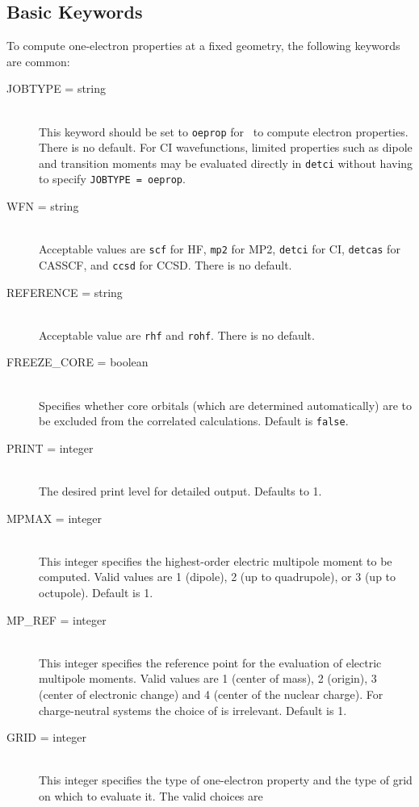 \subsection{Basic Keywords}

To compute one-electron properties at a fixed geometry,
the following keywords are common:
\begin{description}
\item[JOBTYPE = string]\mbox{}\\
This keyword should be set to {\tt oeprop} for \PSIthree\
to compute electron properties. There is no default.
For CI wavefunctions, limited properties such as dipole and 
transition moments may be evaluated directly
in {\tt detci} without having to specify {\tt JOBTYPE = oeprop}.
\item[WFN = string]\mbox{}\\
Acceptable values are {\tt scf} for HF, {\tt mp2} for MP2,
{\tt detci} for CI, {\tt detcas} for CASSCF, and {\tt ccsd}
for CCSD. There is no default.
\item[REFERENCE = string]\mbox{}\\
Acceptable value are {\tt rhf} and {\tt rohf}. There is no default.
\item[FREEZE\_CORE = boolean]\mbox{}\\
Specifies whether core orbitals (which are determined automatically) are to
be excluded from the correlated calculations.  Default is {\tt false}.
\item[PRINT = integer]\mbox{}\\
The desired print level for detailed output. Defaults to 1.
\item[MPMAX = integer]\mbox{}\\
This integer specifies the highest-order electric multipole moment
to be computed. Valid values are 1 (dipole), 2 (up to quadrupole), or
3 (up to octupole). Default is 1.
\item[MP\_REF = integer]\mbox{}\\
This integer specifies the reference point for the evaluation of
electric multipole moments. Valid values are 1 (center of mass),
2 (origin), 3 (center of electronic change) and
4 (center of the nuclear charge). For charge-neutral systems the
choice of \keyword{MP\_REF} is irrelevant. Default is 1.
\item[GRID = integer]\mbox{}\\
This integer specifies the type of one-electron property and the
type of grid on which to evaluate it. The valid choices are
\begin{itemize}

\end{itemize}
\end{description}
